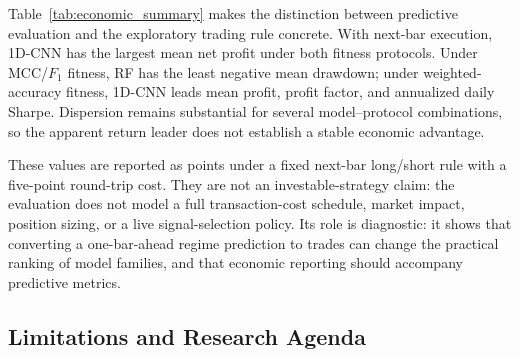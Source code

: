 Table~\ref{tab:economic_summary} makes the distinction between predictive evaluation and the exploratory trading rule concrete. With next-bar execution, 1D-CNN has the largest mean net profit under both fitness protocols. Under MCC/$F_1$ fitness, RF has the least negative mean drawdown; under weighted-accuracy fitness, 1D-CNN leads mean profit, profit factor, and annualized daily Sharpe. Dispersion remains substantial for several model--protocol combinations, so the apparent return leader does not establish a stable economic advantage.

These values are reported as points under a fixed next-bar long/short rule with a five-point round-trip cost. They are not an investable-strategy claim: the evaluation does not model a full transaction-cost schedule, market impact, position sizing, or a live signal-selection policy. Its role is diagnostic: it shows that converting a one-bar-ahead regime prediction to trades can change the practical ranking of model families, and that economic reporting should accompany predictive metrics.

\subsection{Limitations and Research Agenda}

